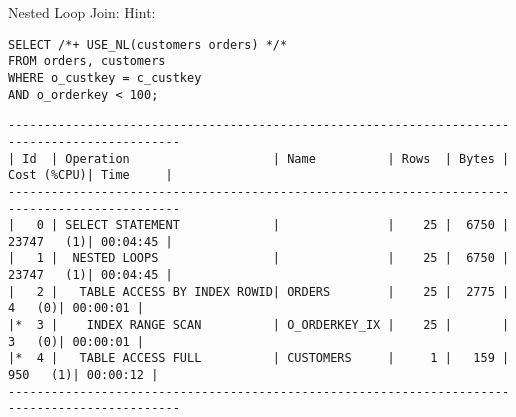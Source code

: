 \documentclass[11pt,a4paper,parskip=half]{scrartcl}
\begin{document}
Nested Loop Join:
Hint:
\begin{lstlisting}
SELECT /*+ USE_NL(customers orders) */*
FROM orders, customers
WHERE o_custkey = c_custkey
AND o_orderkey < 100;
\end{lstlisting}
\begin{lstlisting}
----------------------------------------------------------------------------------------------                                                                                                                                                                                                               
| Id  | Operation                    | Name          | Rows  | Bytes | Cost (%CPU)| Time     |                                                                                                                                                                                                               
----------------------------------------------------------------------------------------------                                                                                                                                                                                                               
|   0 | SELECT STATEMENT             |               |    25 |  6750 | 23747   (1)| 00:04:45 |                                                                                                                                                                                                               
|   1 |  NESTED LOOPS                |               |    25 |  6750 | 23747   (1)| 00:04:45 |                                                                                                                                                                                                               
|   2 |   TABLE ACCESS BY INDEX ROWID| ORDERS        |    25 |  2775 |     4   (0)| 00:00:01 |                                                                                                                                                                                                               
|*  3 |    INDEX RANGE SCAN          | O_ORDERKEY_IX |    25 |       |     3   (0)| 00:00:01 |                                                                                                                                                                                                               
|*  4 |   TABLE ACCESS FULL          | CUSTOMERS     |     1 |   159 |   950   (1)| 00:00:12 |                                                                                                                                                                                                               
----------------------------------------------------------------------------------------------                                                                                                                                                                                                               
                                                                                                                                                                                                                                                                                                             

\end{lstlisting}
\end{document}
